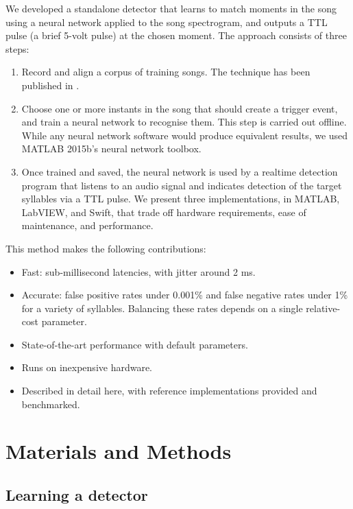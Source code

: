 \documentclass[10pt,letterpaper]{article}
\begin{document}
We developed a standalone detector that learns to match moments in the
song using a neural network applied to the song spectrogram, and
outputs a TTL pulse (a brief 5-volt pulse) at the chosen moment. The
approach consists of three steps:

\begin{enumerate}
\item Record and align a corpus of training songs.  The technique has been published in \cite{Poole2012}.
\item Choose one or more instants in the song that should create a trigger event, and train a
  neural network to recognise them. This step is carried out offline.  While any neural network software would produce equivalent results, we used MATLAB 2015b's neural network toolbox.
\item Once trained and saved, the neural network is used by a realtime
  detection program that listens to an audio signal and indicates detection of the target
  syllables via a TTL pulse.  We present three implementations, in MATLAB, LabVIEW, and Swift, that trade off hardware requirements, ease of maintenance, and performance.
\end{enumerate}
This method makes the following contributions:
\begin{itemize}
\item Fast: sub-millisecond latencies, with jitter around 2 ms.
\item Accurate: false positive rates under 0.001\% and false negative rates under 1\% for a variety of syllables.  Balancing these rates depends on a single relative-cost parameter.
\item State-of-the-art performance with default parameters.
\item Runs on inexpensive hardware.
\item Described in detail here, with reference implementations provided and benchmarked.
\end{itemize}



\section{Materials and Methods}
\label{sec:method}


\subsection{Learning a detector}
\end{document}
